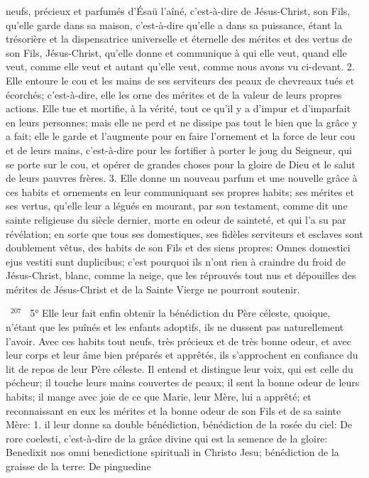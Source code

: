 \documentclass[paper=a5,pagesize=pdftex,fontsize=15pt,headinclude=on,twoside=off]{scrbook}
\newcommand{\negphantom}[1]{\settowidth{\dimen0}{#1}\hspace*{-\dimen0}}
\newcommand{\versenb}[1]{\par \vspace{10pt}~\negphantom{~${}^{#1}$~}${}^{#1}$~}
\begin{document}
neufs, précieux et parfumés d'Ésaü l'aîné, c'est-à-dire de Jésus-Christ, son Fils, qu'elle garde dans sa maison,
c'est-à-dire qu'elle a dans sa puissance, étant la trésorière et la dispensatrice universelle et éternelle des mérites
et des vertus de son Fils, Jésus-Christ, qu'elle donne et communique à qui elle veut, quand elle veut, comme elle
veut et autant qu'elle veut, comme nous avons vu ci-devant. 2. Elle entoure le cou et les mains de ses serviteurs
des peaux de chevreaux tués et écorchés; c'est-à-dire, elle les orne des mérites et de la valeur de leurs propres
actions. Elle tue et mortifie, à la vérité, tout ce qu'il y a d'impur et d'imparfait en leurs personnes; mais elle ne perd
et ne dissipe pas tout le bien que la grâce y a fait; elle le garde et l'augmente pour en faire l'ornement et la force de
leur cou et de leurs mains, c'est-à-dire pour les fortifier à porter le joug du Seigneur, qui se porte sur le cou, et
opérer de grandes choses pour la gloire de Dieu et le salut de leurs pauvres frères. 3. Elle donne un nouveau
parfum et une nouvelle grâce à ces habits et ornements en leur communiquant ses propres habits; ses mérites et
ses vertus, qu'elle leur a légués en mourant, par son testament, comme dit une sainte religieuse du siècle dernier,
morte en odeur de sainteté, et qui l'a su par révélation; en sorte que tous ses domestiques, ses fidèles serviteurs
et esclaves sont doublement vêtus, des habits de son Fils et des siens propres: Omnes domestici ejus vestiti sunt
duplicibus; c'est pourquoi ils n'ont rien à craindre du froid de Jésus-Christ, blanc, comme la neige, que les
réprouvés tout nus et dépouilles des mérites de Jésus-Christ et de la Sainte Vierge ne pourront soutenir.
\versenb{207} 5° Elle leur fait enfin obtenir la bénédiction du Père céleste, quoique, n'étant que les puînés et les enfants
adoptifs, ils ne dussent pas naturellement l'avoir. Avec ces habits tout neufs, très précieux et de très bonne odeur,
et avec leur corps et leur âme bien préparés et apprêtés, ils s'approchent en confiance du lit de repos de leur Père
céleste. Il entend et distingue leur voix, qui est celle du pécheur; il touche leurs mains couvertes de peaux; il sent
la bonne odeur de leurs habits; il mange avec joie de ce que Marie, leur Mère, lui a apprêté; et reconnaissant en
eux les mérites et la bonne odeur de son Fils et de sa sainte Mère: 1. il leur donne sa double bénédiction,
bénédiction de la rosée du ciel: De rore coelesti, c'est-à-dire de la grâce divine qui est la semence de la gloire:
Benedixit nos omni benedictione spirituali in Christo Jesu; bénédiction de la graisse de la terre: De pinguedine
\end{document}
